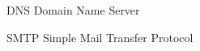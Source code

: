 \begin{siglas}
  \item[DNS] Domain Name Server
  \item[SMTP] Simple Mail Transfer Protocol
\end{siglas}